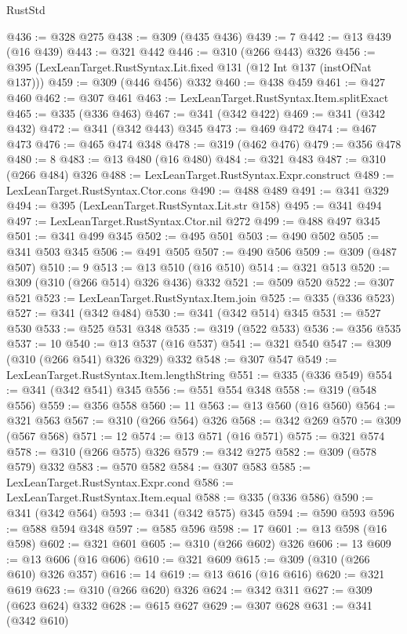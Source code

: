 \begin{lexlean}{RustStd}
\begin{coremodule}
@436 := @328 @275
@438 := @309 (@435 @436)
@439 := 7
@442 := @13 @439 (@16 @439)
@443 := @321 @442
@446 := @310 (@266 @443) @326
@456 := @395 (LexLeanTarget.RustSyntax.Lit.fixed @131 (@12 Int @137 (instOfNat @137)))
@459 := @309 (@446 @456) @332
@460 := @438 @459
@461 := @427 @460
@462 := @307 @461
@463 := LexLeanTarget.RustSyntax.Item.splitExact
@465 := @335 (@336 @463)
@467 := @341 (@342 @422)
@469 := @341 (@342 @432)
@472 := @341 (@342 @443) @345
@473 := @469 @472
@474 := @467 @473
@476 := @465 @474 @348
@478 := @319 (@462 @476)
@479 := @356 @478
@480 := 8
@483 := @13 @480 (@16 @480)
@484 := @321 @483
@487 := @310 (@266 @484) @326
@488 := LexLeanTarget.RustSyntax.Expr.construct
@489 := LexLeanTarget.RustSyntax.Ctor.cons
@490 := @488 @489
@491 := @341 @329
@494 := @395 (LexLeanTarget.RustSyntax.Lit.str @158)
@495 := @341 @494
@497 := LexLeanTarget.RustSyntax.Ctor.nil @272
@499 := @488 @497 @345
@501 := @341 @499 @345
@502 := @495 @501
@503 := @490 @502
@505 := @341 @503 @345
@506 := @491 @505
@507 := @490 @506
@509 := @309 (@487 @507)
@510 := 9
@513 := @13 @510 (@16 @510)
@514 := @321 @513
@520 := @309 (@310 (@266 @514) @326 @436) @332
@521 := @509 @520
@522 := @307 @521
@523 := LexLeanTarget.RustSyntax.Item.join
@525 := @335 (@336 @523)
@527 := @341 (@342 @484)
@530 := @341 (@342 @514) @345
@531 := @527 @530
@533 := @525 @531 @348
@535 := @319 (@522 @533)
@536 := @356 @535
@537 := 10
@540 := @13 @537 (@16 @537)
@541 := @321 @540
@547 := @309 (@310 (@266 @541) @326 @329) @332
@548 := @307 @547
@549 := LexLeanTarget.RustSyntax.Item.lengthString
@551 := @335 (@336 @549)
@554 := @341 (@342 @541) @345
@556 := @551 @554 @348
@558 := @319 (@548 @556)
@559 := @356 @558
@560 := 11
@563 := @13 @560 (@16 @560)
@564 := @321 @563
@567 := @310 (@266 @564) @326
@568 := @342 @269
@570 := @309 (@567 @568)
@571 := 12
@574 := @13 @571 (@16 @571)
@575 := @321 @574
@578 := @310 (@266 @575) @326
@579 := @342 @275
@582 := @309 (@578 @579) @332
@583 := @570 @582
@584 := @307 @583
@585 := LexLeanTarget.RustSyntax.Expr.cond
@586 := LexLeanTarget.RustSyntax.Item.equal
@588 := @335 (@336 @586)
@590 := @341 (@342 @564)
@593 := @341 (@342 @575) @345
@594 := @590 @593
@596 := @588 @594 @348
@597 := @585 @596
@598 := 17
@601 := @13 @598 (@16 @598)
@602 := @321 @601
@605 := @310 (@266 @602) @326
@606 := 13
@609 := @13 @606 (@16 @606)
@610 := @321 @609
@615 := @309 (@310 (@266 @610) @326 @357)
@616 := 14
@619 := @13 @616 (@16 @616)
@620 := @321 @619
@623 := @310 (@266 @620) @326
@624 := @342 @311
@627 := @309 (@623 @624) @332
@628 := @615 @627
@629 := @307 @628
@631 := @341 (@342 @610)

\end{coremodule}
\end{lexlean}
